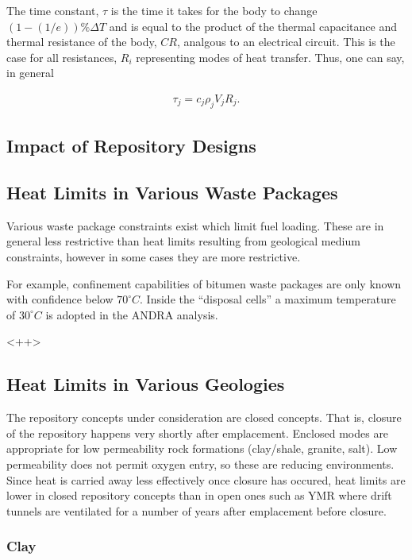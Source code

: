 The time constant, $\tau$ is the time it takes for the body to change 
$(1-(1/e))\%\Delta T$ and is equal to the product of the thermal capacitance and 
thermal resistance of the body, $CR$, analgous to an electrical circuit.
\cite{el-wakil_nuclear_1981} This is the case for all resistances, $R_i$ 
representing modes of heat transfer. Thus, one can say, in general

\begin{align*}
  \tau_j = c_j \rho_j V_j R_j.
\end{align*}

\subsection{Impact of Repository Designs}

\subsection{Heat Limits in Various Waste Packages} 

Various waste package constraints exist which limit fuel loading. These are 
in general less restrictive than heat limits resulting from geological medium 
constraints, however in some cases they are more restrictive. 

For example, confinement capabilities of bitumen waste packages are only known 
with confidence below $70^\circ C$. Inside the ``disposal cells'' a maximum 
temperature of $ 30 ^\circ C$ is adopted in the \gls{ANDRA} analysis. 
\cite{andra_argile:_2005}

<++>

\subsection{Heat Limits in Various Geologies}


The repository concepts under consideration are closed concepts. That is, 
closure of the repository happens very shortly after emplacement.
Enclosed modes are appropriate for low permeability rock formations (clay/shale, 
granite, salt). Low permeability does not permit oxygen entry, so these are
reducing environments. Since heat is carried away less effectively once closure 
has occured, heat limits are lower in  closed repository concepts than in open 
ones such as \gls{YMR} where drift tunnels are ventilated for a number of years
after emplacement before closure.

\subsubsection{Clay} 

